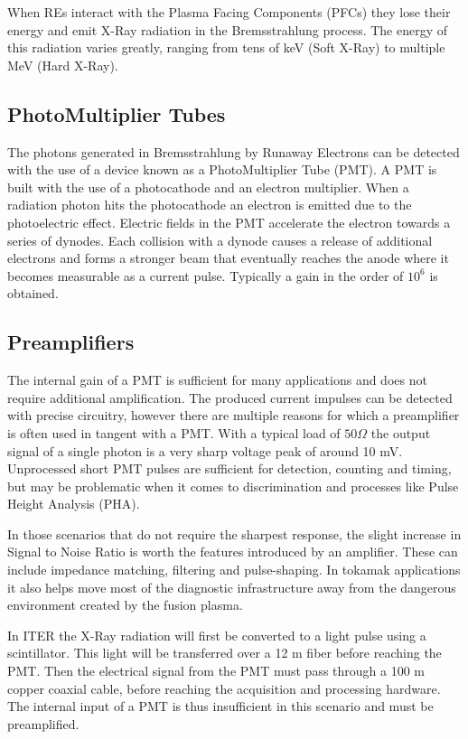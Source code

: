 When REs interact with the Plasma Facing Components (PFCs)
they lose their energy and emit X-Ray radiation in 
the Bremsstrahlung process. The energy of this radiation
varies greatly, ranging from tens of keV (Soft X-Ray)
to multiple MeV (Hard X-Ray).
\cite{hxrm_jet}

\subsection{PhotoMultiplier Tubes}

The photons generated in Bremsstrahlung by Runaway Electrons
can be detected with the use of a device known as a PhotoMultiplier Tube (PMT).
A PMT is built with the use of a photocathode and an electron multiplier.
When a radiation photon hits the photocathode an electron is emitted
due to the photoelectric effect. Electric fields in the PMT accelerate the 
electron towards a series of dynodes. Each collision with a dynode causes
a release of additional electrons and forms a stronger beam that 
eventually reaches the anode where it becomes measurable as a current pulse.
Typically a gain in the order of $10^6$ is obtained.
\cite{pmts_basics, pmt_gain}

\subsection{Preamplifiers}

The internal gain of a PMT is sufficient for many applications and 
does not require additional amplification. The produced current impulses 
can be detected with precise circuitry,
however there are multiple reasons for which
a preamplifier is often used in tangent with a PMT. With a typical
load of $50 \Omega$ the output signal of a single photon is
a very sharp voltage peak of around 10 mV.
Unprocessed short PMT pulses are sufficient for detection, counting 
and timing, but may be problematic when it comes to discrimination and 
processes like Pulse Height Analysis (PHA).
\cite{why_pmt_need_amplifiers}


In those scenarios that do not require the sharpest response,
the slight increase in Signal to Noise Ratio is worth the 
features introduced by an amplifier. These can include
impedance matching, filtering and pulse-shaping.
In tokamak applications it also helps move most of the 
diagnostic infrastructure away from the dangerous environment
created by the fusion plasma. 


In ITER the X-Ray radiation will first be converted to a light pulse
using a scintillator. This light will be transferred over a 12 m 
fiber before reaching the PMT. Then the electrical signal from 
the PMT must pass through a 100 m copper coaxial cable, before
reaching the acquisition and processing hardware. The internal 
input of a PMT is thus insufficient in this scenario and must be 
preamplified.
\cite{low_noise_amplifier_for_pmt}

